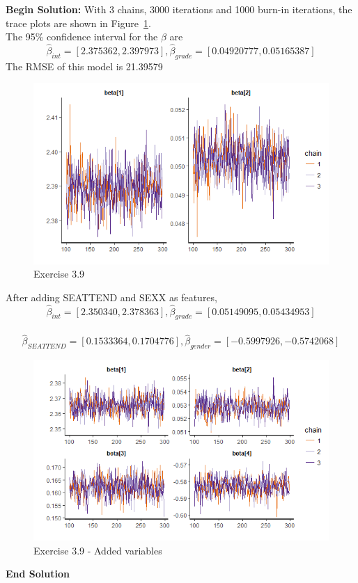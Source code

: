 \documentclass[twoside]{article}
\begin{document}
\textbf{Begin Solution:}
With 3 chains, 3000 iterations and 1000 burn-in iterations, the trace plots are shown in Figure~\ref{Feature: Grade}.\\
The 95\% confidence interval for the $\beta$ are
$$\hat{\beta}_{int}=[2.375362,2.397973],\hat{\beta}_{grade}=[0.04920777,0.05165387 ]$$
The RMSE of this model is 21.39579\\
\begin{figure}[H]
\begin{center}
\includegraphics[width=\textwidth]{./MATLAB/3.9/traceplot39.png}
\end{center}
\caption{Exercise 3.9}
\label{Feature: Grade}
\end{figure}
After adding SEATTEND and SEXX as features, 
$$\hat{\beta}_{int}=[2.350340,2.378363],\hat{\beta}_{grade}=[0.05149095,0.05434953 ]$$\\$$\hat{\beta}_{SEATTEND}=[0.1533364,0.1704776],\hat{\beta}_{gender}=[-0.5997926,-0.5742068 ]$$
\begin{figure}[H]
\begin{center}
\includegraphics[width=\textwidth]{./MATLAB/3.9/traceplot39_2.png}
\end{center}
\caption{Exercise 3.9 - Added variables}
\label{Feature: Grade and some more}
\end{figure}
\textbf{End Solution}
  
\end{document}
